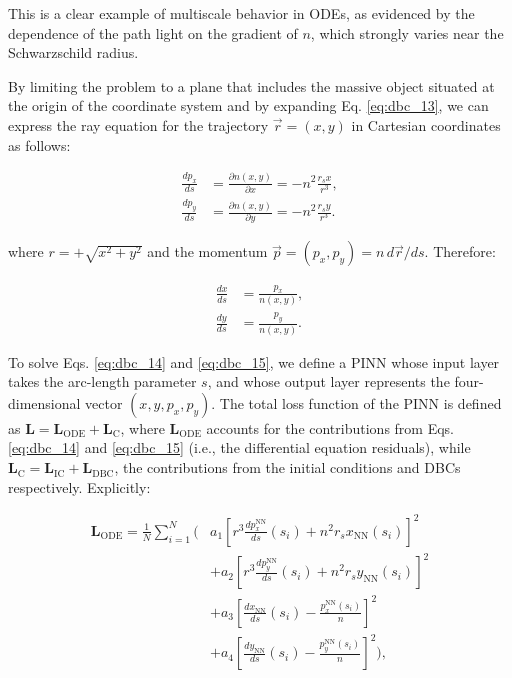 This is a clear example of multiscale behavior in ODEs, as evidenced by the dependence of the path light on the gradient of $n$, which strongly varies near the Schwarzschild radius.

By limiting the problem to a plane that includes the massive object situated at the origin of the coordinate system and by expanding Eq. \ref{eq:dbc_13}, we can express the ray equation for the trajectory $\vec{r}=(x,y)$ in Cartesian coordinates as follows:

\begin{equation}\label{eq:dbc_14}
\begin{aligned}\frac{dp_x}{ds}&=\frac{\partial n(x,y)}{\partial x}=-n^2\frac{r_sx}{r^3},\\\frac{dp_y}{ds}&=\frac{\partial n(x,y)}{\partial y}=-n^2\frac{r_sy}{r^3}.\end{aligned}
\end{equation}

where $r=+\sqrt{x^2+y^2}$ and the momentum $\vec{p}=(p_x,p_y)=n\,d\vec{r}/ds$. Therefore:

\begin{equation}\label{eq:dbc_15}
\begin{aligned}\frac{dx}{ds}&=\frac{p_x}{n(x,y)},\\\frac{dy}{ds}&=\frac{p_y}{n(x,y)}.\end{aligned}
\end{equation}

To solve Eqs. \ref{eq:dbc_14} and \ref{eq:dbc_15}, we define a PINN whose input layer takes the arc-length parameter $s$, and whose output layer represents the four-dimensional vector $(x,y,p_x,p_y)$. The total loss function of the PINN is defined as $\mathbf{L} = \mathbf{L}_{\mathrm{ODE}} + \mathbf{L}_{\mathrm{C}}$, where $\mathbf{L}_{\mathrm{ODE}}$ accounts for the contributions from Eqs. \ref{eq:dbc_14} and \ref{eq:dbc_15} (i.e., the differential equation residuals), while $\mathbf{L}_{\mathrm{C}} = \mathbf{L}_{\mathrm{IC}} + \mathbf{L}_{\mathrm{DBC}}$, the contributions from the initial conditions and DBCs respectively. Explicitly:

\begin{equation}\label{eq:dbc_16}
\begin{aligned}
\mathbf{L}_{\mathrm{ODE}}=\frac{1}{N}\sum_{i=1}^N\Bigg(&a_1\left[r^3\frac{dp_x^{\mathrm{NN}}}{ds}(s_i)+n^2r_sx_{\mathrm{NN}}(s_i)\right]^2\\
&+a_2\left[r^3\frac{dp_y^{\mathrm{NN}}}{ds}(s_i)+n^2r_sy_{\mathrm{NN}}(s_i)\right]^2\\
&+a_3\left[\frac{dx_{\mathrm{NN}}}{ds}(s_i)-\frac{p_x^{\mathrm{NN}}(s_i)}{n}\right]^2\\
&+a_4\left[\frac{dy_{\mathrm{NN}}}{ds}(s_i)-\frac{p_y^{\mathrm{NN}}(s_i)}{n}\right]^2\Bigg),
\end{aligned}
\end{equation}

